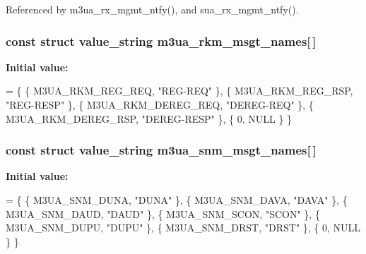 Referenced by m3ua\+\_\+rx\+\_\+mgmt\+\_\+ntfy(), and sua\+\_\+rx\+\_\+mgmt\+\_\+ntfy().

\subsubsection[{m3ua\+\_\+rkm\+\_\+msgt\+\_\+names}]{\setlength{\rightskip}{0pt plus 5cm}const struct value\+\_\+string m3ua\+\_\+rkm\+\_\+msgt\+\_\+names[$\,$]\hspace{0.3cm}{\ttfamily [static]}}\label{m3ua_8c_a1d9d393e28f0e2247757af11c490f39e}
{\bfseries Initial value\+:}
\begin{DoxyCode}
= \{
        \{ M3UA_RKM_REG_REQ,     \textcolor{stringliteral}{"REG-REQ"} \},
        \{ M3UA_RKM_REG_RSP,     \textcolor{stringliteral}{"REG-RESP"} \},
        \{ M3UA_RKM_DEREG_REQ,   \textcolor{stringliteral}{"DEREG-REQ"} \},
        \{ M3UA_RKM_DEREG_RSP,   \textcolor{stringliteral}{"DEREG-RESP"} \},
        \{ 0, NULL \}
\}
\end{DoxyCode}
\subsubsection[{m3ua\+\_\+snm\+\_\+msgt\+\_\+names}]{\setlength{\rightskip}{0pt plus 5cm}const struct value\+\_\+string m3ua\+\_\+snm\+\_\+msgt\+\_\+names[$\,$]\hspace{0.3cm}{\ttfamily [static]}}\label{m3ua_8c_a96ad2b2c9d56411f67c26a6b5c6d7bdd}
{\bfseries Initial value\+:}
\begin{DoxyCode}
= \{
        \{ M3UA_SNM_DUNA,        \textcolor{stringliteral}{"DUNA"} \},
        \{ M3UA_SNM_DAVA,        \textcolor{stringliteral}{"DAVA"} \},
        \{ M3UA_SNM_DAUD,        \textcolor{stringliteral}{"DAUD"} \},
        \{ M3UA_SNM_SCON,        \textcolor{stringliteral}{"SCON"} \},
        \{ M3UA_SNM_DUPU,        \textcolor{stringliteral}{"DUPU"} \},
        \{ M3UA_SNM_DRST,        \textcolor{stringliteral}{"DRST"} \},
        \{ 0, NULL \}
\}
\end{DoxyCode}

